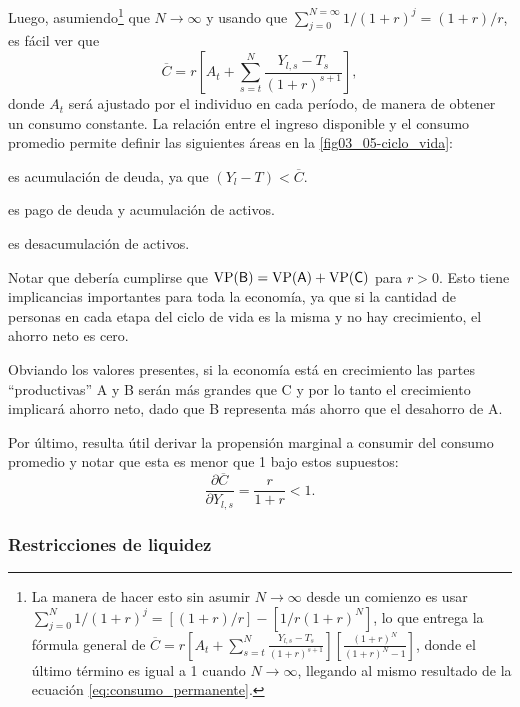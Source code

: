 \documentclass[DeGregorioResumen]{subfiles}
\begin{document}
Luego, asumiendo\footnote{La manera de hacer esto sin asumir $N\rightarrow\infty$ desde un comienzo es usar $\sum_{j=0}^{N}{1/(1+r)^j} = [(1+r)/r]-[1/r(1+r)^N]$, lo que entrega la fórmula general de $\overline{C} = r\left[A_t+\sum_{s=t}^{N}{\frac{Y_{l,s}-T_s}{(1+r)^{s+1}}}\right]\left[\frac{(1+r)^N}{(1+r)^N-1}\right]$, donde el último término es igual a 1 cuando $N\rightarrow\infty$, llegando al mismo resultado de la ecuación \eqref{eq:consumo_permanente}.} que $N\rightarrow\infty$ y usando que $\sum_{j=0}^{N=\infty}{1/(1+r)^j}= (1+r)/r$, es fácil ver que
\begin{equation}
\overline{C} = r\left[A_t+\sum_{s=t}^{N}{\frac{Y_{l,s}-T_s}{(1+r)^{s+1}}}\right],
\label{eq:consumo_permanente}
\end{equation}
donde $A_t$ será ajustado por el individuo en cada período, de manera de obtener un consumo constante. La relación entre el ingreso disponible y el consumo promedio permite definir las siguientes áreas en la \autoref{fig03_05-ciclo_vida}:

\begin{where}
  \item[\text{\textsf{A}}] es acumulación de deuda, ya que $(Y_l-T)<\overline{C}$.
  \item[\text{\textsf{B}}] es pago de deuda y acumulación de activos.
  \item[\text{\textsf{C}}] es desacumulación de activos.
\end{where}

Notar que debería cumplirse que $\text{VP(\textsf{B})} = \text{VP(\textsf{A})} + \text{VP(\textsf{C})}$ para $r>0$. Esto tiene implicancias importantes para toda la economía, ya que si la cantidad de personas en cada etapa del ciclo de vida es la misma y no hay crecimiento, el ahorro neto es cero.

Obviando los valores presentes, si la economía está en crecimiento las partes ``productivas'' \textsf{A} y \textsf{B} serán más grandes que \textsf{C} y por lo tanto el crecimiento implicará ahorro neto, dado que \textsf{B} representa más ahorro que el desahorro de \textsf{A}.

Por último, resulta útil derivar la propensión marginal a consumir del consumo promedio y notar que esta es menor que 1 bajo estos supuestos:
\begin{equation*}
\frac{\partial \overline{C}}{\partial Y_{l,s}}=\frac{r}{1+r} <1.
\end{equation*}

\subsubsection{Restricciones de liquidez} %
\end{document}

